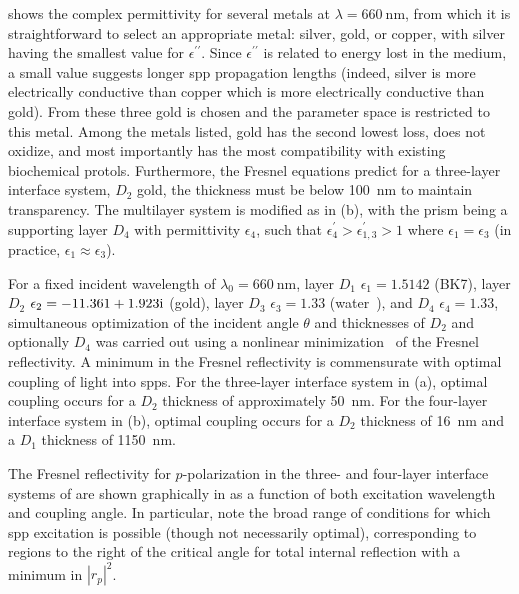  shows the complex permittivity for several metals
at $\lambda=\SI{660}{\nano\meter}$, from which it is straightforward to
select an appropriate metal: silver, gold, or copper, with silver having
the smallest value for $\epsilon^{\prime\prime}$.  Since
$\epsilon^{\prime\prime}$ is related to energy lost in the medium, a small
value suggests longer \gls{spp} propagation lengths (indeed, silver is more
electrically conductive than copper which is more electrically conductive
than gold).  From these three gold is chosen and the parameter space is
restricted to this metal.  Among the metals listed, gold has the second
lowest loss, does not oxidize, and most importantly has the most
compatibility with existing biochemical protols.  Furthermore, the Fresnel
equations predict for a three-layer interface system, $D_2$ gold, the
thickness must be below \SI{100}{\nano\meter} to maintain transparency.
The multilayer system is modified as in (b),
with the prism being a supporting layer $D_4$ with permittivity
$\epsilon_4$, such that $\epsilon^\prime_4>\epsilon^\prime_{1,3}>1$ where
$\epsilon_1=\epsilon_3$ (in practice, $\epsilon_1\approx\epsilon_3$).

For a fixed incident wavelength of $\lambda_0=\SI{660}{\nano\meter}$, layer
$D_1$ $\epsilon_1=1.5142$ (BK7), layer $D_2$
$\epsilon_2=\complexnum{-11.361+1.923i}$ (gold), layer $D_3$ $\epsilon_3=1.33$
(water~\cite{andreasson1971measurement}), and $D_4$ $\epsilon_4=1.33$,
simultaneous optimization of the incident angle $\theta$ and thicknesses of
$D_2$ and optionally $D_4$ was carried out using a nonlinear
minimization~\cite{brent1973algorithms} of the Fresnel reflectivity.  A
minimum in the Fresnel reflectivity is commensurate with optimal coupling
of light into \glspl{spp}.  For the three-layer interface system in
(a), optimal coupling occurs for a $D_2$
thickness of approximately \SI{50}{\nano\meter}.  For the four-layer
interface system in (b), optimal coupling
occurs for a $D_2$ thickness of \SI{16}{\nano\meter} and a $D_1$ thickness
of \SI{1150}{\nano\meter}.

The Fresnel reflectivity for $p$-polarization in the three- and four-layer
interface systems of  are shown graphically
in  as a function of both excitation wavelength
and coupling angle.  In particular, note the broad range of conditions for
which \gls{spp} excitation is possible (though not necessarily optimal),
corresponding to regions to the right of the critical angle for total
internal reflection with a minimum in $|r_p|^2$.

